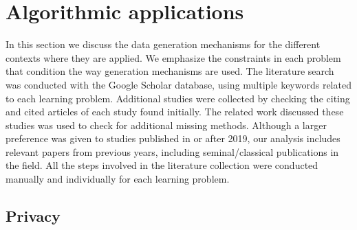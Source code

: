\documentclass[parskip=full]{scrartcl}
\begin{document}
% 
% 
% 
% 

\section{Algorithmic applications}\label{sec:algorithmic-applications}

In this section we discuss the data generation mechanisms for the different
contexts where they are applied. We emphasize the constraints in each problem
that condition the way generation mechanisms are used. The literature search
was conducted with the Google Scholar database, using multiple keywords
related to each learning problem. Additional studies were collected by
checking the citing and cited articles of each study found initially. The
related work discussed these studies was used to check for additional missing
methods. Although a larger preference was given to studies published in or
after 2019, our analysis includes relevant papers from previous years,
including seminal/classical publications in the field. All the steps involved
in the literature collection were conducted manually and individually for each
learning problem.

\subsection{Privacy}\label{sec:data-privacy}
\end{document}

